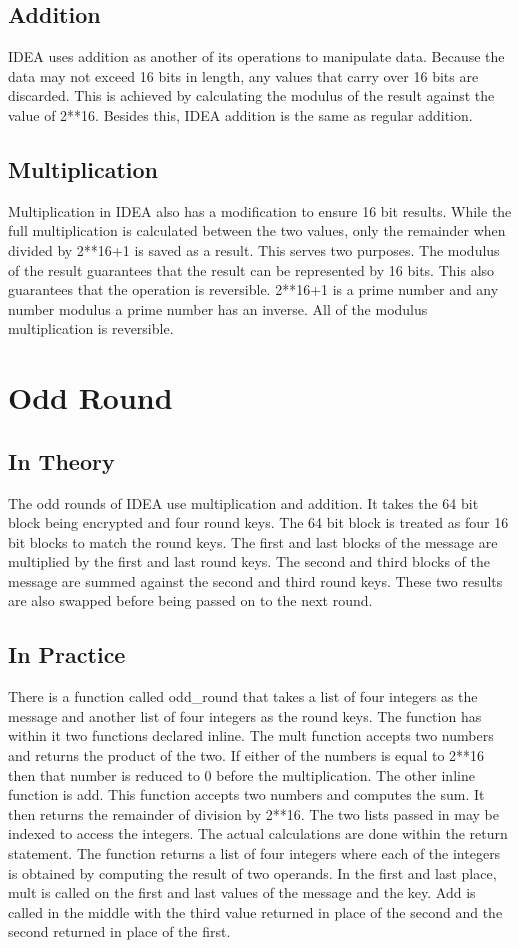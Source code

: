 \documentclass[12pt]{article}
\begin{document}
\subsection{Addition}
IDEA uses addition as another of its operations to manipulate data. Because the data may not exceed 16 bits in length, any values that carry over 16 bits are discarded. This is achieved by calculating the modulus of the result against the value of 2**16. Besides this, IDEA addition is the same as regular addition.
\subsection{Multiplication}
Multiplication in IDEA also has a modification to ensure 16 bit results. While the full multiplication is calculated between the two values, only the remainder when divided by 2**16+1 is saved as a result. This serves two purposes. The modulus of the result guarantees that the result can be represented by 16 bits. This also guarantees that the operation is reversible.
2**16+1 is a prime number and any number modulus a prime number has an inverse. All of the modulus multiplication is reversible.
\section{Odd Round}
\subsection{In Theory}
The odd rounds of IDEA use multiplication and addition. It takes the 64 bit block being encrypted and four round keys. The 64 bit block is treated as four 16 bit blocks to match the round keys. The first and last blocks of the message are multiplied by the first and last round keys. The second and third blocks of the message are summed against the second and third round keys. These two results are also swapped before being passed on to the next round.
\subsection{In Practice}
There is a function called odd\_round that takes a list of four integers as the message and another list of four integers as the round keys. The function has within it two functions declared inline. The mult function accepts two numbers and returns the product of the two. If either of the numbers is equal to 2**16 then that number is reduced to 0 before the multiplication. The other inline function is add. This function accepts two numbers and computes the sum. It then returns the remainder of division by 2**16.
The two lists passed in may be indexed to access the integers. The actual calculations are done within the return statement. The function returns a list of four integers where each of the integers is obtained by computing the result of two operands. In the first and last place, mult is called on the first and last values of the message and the key. Add is called in the middle with the third value returned in place of the second and the second returned in place of the first.
\end{document}
